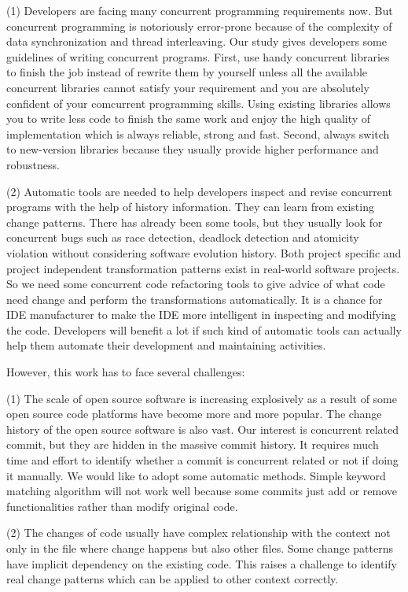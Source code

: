 \documentclass[conference]{IEEEtran}
\begin{document}
(1) Developers are facing many concurrent programming requirements now. But concurrent programming is notoriously error-prone because of the complexity of data synchronization and thread interleaving. Our study gives developers some guidelines of writing concurrent programs. First, use handy concurrent libraries to finish the job instead of rewrite them by yourself unless all the available concurrent libraries cannot satisfy your requirement and you are absolutely confident of your comcurrent programming skills. Using existing libraries allows you to  write less code to finish the same work and enjoy the high quality of implementation which is always reliable, strong and fast. Second, always switch to new-version libraries because they usually provide higher performance and robustness.

(2) Automatic tools are needed to help developers inspect and revise concurrent programs with the help of history information. They can learn from existing change patterns. There has already been some tools, but they usually look for concurrent bugs such as race detection, deadlock detection and atomicity violation without considering software evolution history. Both project specific and project independent transformation patterns exist in real-world software projects. So we need some concurrent code refactoring tools to give advice of what code need change and perform the transformations automatically. It is a chance for IDE manufacturer to make the IDE more intelligent in inspecting and modifying the code. Developers will benefit a lot if such kind of automatic tools can actually help them automate their development and maintaining activities.

However, this work has to face several challenges:

(1) The scale of open source software is increasing explosively as a result of some open source code platforms have become more and more popular. The change history of the open source software is also vast. Our interest is concurrent related commit, but they are hidden in the massive commit history. It requires much time and effort to identify whether a commit is concurrent related or not if doing it manually. We would like to adopt some automatic methods. Simple keyword matching algorithm will not work well because some commits just add or remove functionalities rather than modify original code.

(2) The changes of code usually have complex relationship with the context not only in the file where change happens but also other files. Some change patterns have implicit dependency on the existing code. This raises a challenge to identify real change patterns which can be applied to other context correctly.
\end{document}
